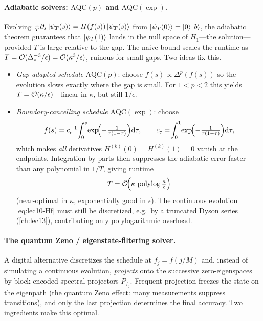 \paragraph{Adiabatic solvers: $\mathrm{AQC}(p)$ and $\mathrm{AQC}(\exp)$.}
Evolving $\tfrac{\mathrm{i}}{T}\partial_s\ket{\psi_T(s)}=H(f(s))\ket{\psi_T(s)}$ from
$\ket{\psi_T(0)}=\ket0\ket b$, the adiabatic theorem guarantees that
$\ket{\psi_T(1)}$ lands in the null space of $H_1$---the solution---provided $T$ is
large relative to the gap. The naive bound scales the runtime as
$T=\mathcal{O}(\Delta_*^{-3}/\epsilon)=\mathcal{O}(\kappa^3/\epsilon)$, ruinous for small gaps. Two
ideas fix this.
\begin{itemize}[leftmargin=1.4em,nosep]
  \item \emph{Gap-adapted schedule} $\mathrm{AQC}(p)$: choose $\dot f(s)\propto
    \Delta^p(f(s))$ so the evolution slows exactly where the gap is small. For
    $1<p<2$ this yields $T=\mathcal{O}(\kappa/\epsilon)$---linear in $\kappa$, but still
    $1/\epsilon$.
  \item \emph{Boundary-cancelling schedule} $\mathrm{AQC}(\exp)$: choose
    \begin{equation}
      f(s)=c_e^{-1}\!\int_0^s\!\exp\!\Bigl(-\tfrac1{\tau(1-\tau)}\Bigr)\mathrm{d}\tau,\qquad
      c_e=\!\int_0^1\!\exp\!\Bigl(-\tfrac1{\tau(1-\tau)}\Bigr)\mathrm{d}\tau,
      \label{eq:lec10-aqcexp}
    \end{equation}
    which makes \emph{all} derivatives $H^{(k)}(0)=H^{(k)}(1)=0$ vanish at the
    endpoints. Integration by parts then suppresses the adiabatic error faster than any
    polynomial in $1/T$, giving runtime
    \begin{equation}
      T=\mathcal{O}\!\Bigl(\kappa\,\operatorname{polylog}\tfrac\kappa\epsilon\Bigr)
      \label{eq:lec10-aqcexp-cost}
    \end{equation}
    (near-optimal in $\kappa$, exponentially good in $\epsilon$). The continuous
    evolution \eqref{eq:lec10-Hf} must still be discretized, e.g.\ by a truncated Dyson
    series (\cref{ch:lec13}), contributing only polylogarithmic overhead.
\end{itemize}

\paragraph{The quantum Zeno / eigenstate-filtering solver.}
A digital alternative discretizes the schedule at $f_j=f(j/M)$ and, instead of
simulating a continuous evolution, \emph{projects} onto the successive zero-eigenspaces
by block-encoded spectral projectors $P_{f_j}$. Frequent projection freezes the state
on the eigenpath (the quantum Zeno effect: many measurements suppress transitions), and
only the last projection determines the final accuracy. Two ingredients make this
optimal.

